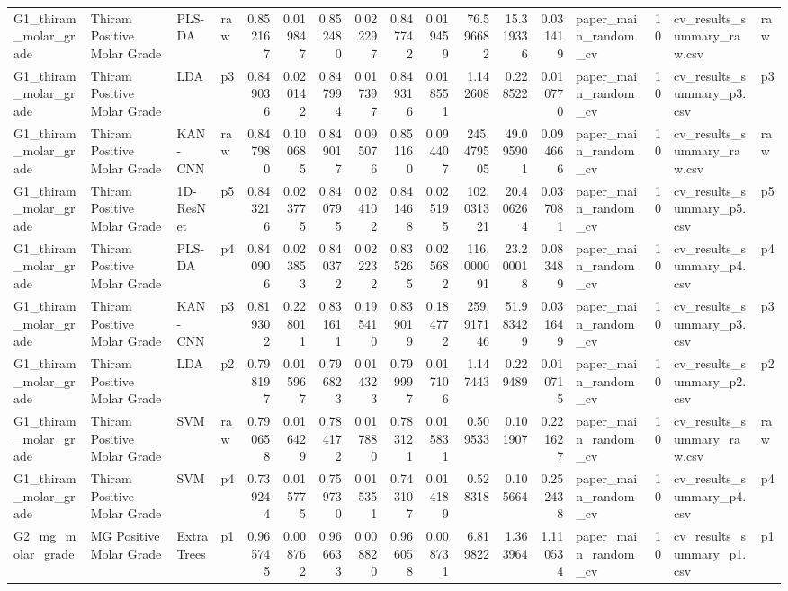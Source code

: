 \begin{tabular}{llllrrrrrrrrrlrll}
G1_thiram_molar_grade & Thiram Positive Molar Grade & PLS-DA & raw & 0.852167 & 0.019847 & 0.852480 & 0.022297 & 0.847742 & 0.019459 & 76.596682 & 15.319336 & 0.031419 & paper_main_random_cv & 10 & cv_results_summary_raw.csv & raw \\
G1_thiram_molar_grade & Thiram Positive Molar Grade & LDA & p3 & 0.849036 & 0.020142 & 0.847994 & 0.017397 & 0.849316 & 0.018551 & 1.142608 & 0.228522 & 0.010770 & paper_main_random_cv & 10 & cv_results_summary_p3.csv & p3 \\
G1_thiram_molar_grade & Thiram Positive Molar Grade & KAN-CNN & raw & 0.847980 & 0.100685 & 0.849017 & 0.095076 & 0.851160 & 0.094407 & 245.479505 & 49.095901 & 0.094666 & paper_main_random_cv & 10 & cv_results_summary_raw.csv & raw \\
G1_thiram_molar_grade & Thiram Positive Molar Grade & 1D-ResNet & p5 & 0.843216 & 0.023775 & 0.840795 & 0.024102 & 0.841468 & 0.025195 & 102.031321 & 20.406264 & 0.037081 & paper_main_random_cv & 10 & cv_results_summary_p5.csv & p5 \\
G1_thiram_molar_grade & Thiram Positive Molar Grade & PLS-DA & p4 & 0.840906 & 0.023853 & 0.840372 & 0.022232 & 0.835265 & 0.025682 & 116.000091 & 23.200018 & 0.083489 & paper_main_random_cv & 10 & cv_results_summary_p4.csv & p4 \\
G1_thiram_molar_grade & Thiram Positive Molar Grade & KAN-CNN & p3 & 0.819302 & 0.228011 & 0.831611 & 0.195410 & 0.839019 & 0.184772 & 259.917146 & 51.983429 & 0.031649 & paper_main_random_cv & 10 & cv_results_summary_p3.csv & p3 \\
G1_thiram_molar_grade & Thiram Positive Molar Grade & LDA & p2 & 0.798197 & 0.015967 & 0.796823 & 0.014323 & 0.799997 & 0.017106 & 1.147443 & 0.229489 & 0.010715 & paper_main_random_cv & 10 & cv_results_summary_p2.csv & p2 \\
G1_thiram_molar_grade & Thiram Positive Molar Grade & SVM & raw & 0.790658 & 0.016429 & 0.784172 & 0.017880 & 0.783121 & 0.015831 & 0.509533 & 0.101907 & 0.221627 & paper_main_random_cv & 10 & cv_results_summary_raw.csv & raw \\
G1_thiram_molar_grade & Thiram Positive Molar Grade & SVM & p4 & 0.739244 & 0.015775 & 0.759730 & 0.015351 & 0.743107 & 0.014189 & 0.528318 & 0.105664 & 0.252438 & paper_main_random_cv & 10 & cv_results_summary_p4.csv & p4 \\
G2_mg_molar_grade & MG Positive Molar Grade & ExtraTrees & p1 & 0.965745 & 0.008762 & 0.966633 & 0.008820 & 0.966058 & 0.008731 & 6.819822 & 1.363964 & 1.110534 & paper_main_random_cv & 10 & cv_results_summary_p1.csv & p1 \\

\end{tabular}
